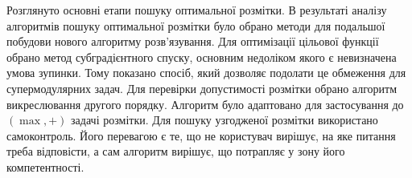 \chapterConclusion

Розглянуто основні етапи пошуку оптимальної розмітки.
В результаті аналізу алгоритмів пошуку оптимальної розмітки було обрано методи для подальшої побудови нового алгоритму розв’язування.
Для оптимізації цільової функції обрано метод субградієнтного спуску, основним недоліком
якого є невизначена умова зупинки. Тому показано спосіб, який дозволяє подолати це обмеження для супермодулярних задач.
Для перевірки допустимості розмітки обрано алгоритм викреслювання другого порядку. Алгоритм було адаптовано
для застосування до $(\max,+)$ задачі розмітки. Для пошуку узгодженої розмітки використано самоконтроль. Його перевагою є те, 
що не користувач вирішує, на яке питання треба відповісти, а сам алгоритм вирішує, що потрапляє у
зону його компетентності.
